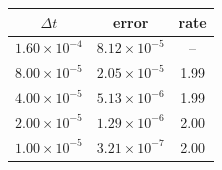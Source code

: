 \begin{tabular}{c cc}
\toprule
$\Delta t$ & error & rate\\
\midrule
$1.60{\times}10^{-4}$ & $8.12{\times}10^{-5}$ & --\\
$8.00{\times}10^{-5}$ & $2.05{\times}10^{-5}$ & 1.99\\
$4.00{\times}10^{-5}$ & $5.13{\times}10^{-6}$ & 1.99\\
$2.00{\times}10^{-5}$ & $1.29{\times}10^{-6}$ & 2.00\\
$1.00{\times}10^{-5}$ & $3.21{\times}10^{-7}$ & 2.00\\
\bottomrule
\end{tabular}
